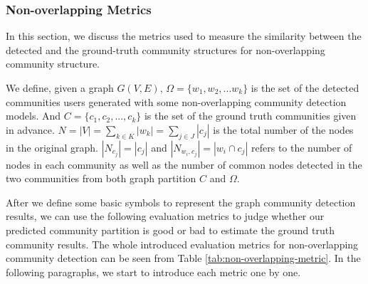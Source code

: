 \subsubsection{Non-overlapping Metrics}
In this section, we discuss the metrics used to measure the similarity between the detected and the ground-truth community structures for non-overlapping community structure.

We define, given a graph $G(V,E)$,  $\Omega = \{w_{1},w_{2},...w_{k}\}$ is the set of the detected communities users generated with some non-overlapping community detection models. And $C = \{c_{1},c_{2},...,c_{k}\}$ is the set of the ground truth communities given in advance. $N = |V| = \sum_{k \in K}|w_{k}|= \sum_{j \in J}|c_{j}|$  is the total number of the nodes in the original graph. $|N_{c_{j}}| = |c_{j}|$ and $|N_{w_{i},c_{j}}| = |w_{i} \cap c_{j}|$ refers to the number of nodes in each community as well as the number of common nodes detected in the two communities from both graph partition $C$ and $\Omega$.

After we define some basic symbols to represent the graph community detection results, we can use the following evaluation metrics to judge whether our predicted community partition is good or bad to estimate the ground truth community results. The whole introduced evaluation metrics for non-overlapping community detection can be seen from Table \ref{tab:non-overlapping-metric}. In the following paragraphs, we start to introduce each metric one by one.

